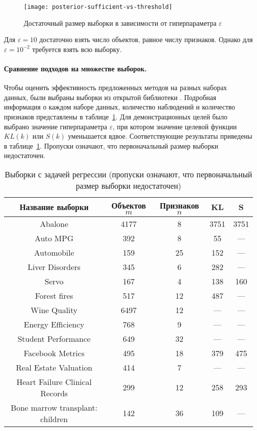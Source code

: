 \begin{figure}[h!]
    \centering
    \texttt{[image: posterior-sufficient-vs-threshold]}
    \caption{Достаточный размер выборки в зависимости от гиперпараметра $\varepsilon$}
    \label{posterior-sufficient-vs-threshold}
\end{figure}

Для $\varepsilon=10$ достаточно взять число объектов, равное числу признаков. Однако для $\varepsilon=10^{-2}$ требуется взять всю выборку.

\paragraph{Сравнение подходов на множестве выборок.}

Чтобы оценить эффективность предложенных методов на разных наборах данных, были выбраны выборки из открытой библиотеки \cite{UCI}. Подробная информация о каждом наборе данных, количество наблюдений и количество признаков представлены в таблице~\ref{table}. Для демонстрационных целей было выбрано значение гиперпараметра $\varepsilon$, при котором значение целевой функции $KL(k)$ или $S(k)$ уменьшается вдвое. Соответствующие результаты приведены в таблице~\ref{table}. Пропуски означают, что первоначальный размер выборки недостаточен.

\begin{table}
    \centering
    \caption{Выборки с задачей регрессии (пропуски означают, что первоначальный размер выборки недостаточен)}\label{table}
    \begin{tabular}{|c|c|c|c|c|}
    \hline
    Название выборки & Объектов $m$ & Признаков $n$ & KL & S \\
    \hline
    Abalone & 4177 & 8 & 3751 & 3751\\
    Auto MPG & 392 & 8 & 55 & --- \\
    Automobile & 159 & 25 & 152 & --- \\
    Liver Disorders & 345 & 6 & 282 & --- \\
    Servo & 167 & 4 & 138 & 160 \\
    Forest fires & 517 & 12 & 487 & --- \\
    Wine Quality & 6497 & 12 & --- & --- \\
    Energy Efficiency & 768 & 9 & --- & --- \\
    Student Performance & 649 & 32 & --- & --- \\
    Facebook Metrics & 495 & 18 & 379 & 475  \\
    Real Estate Valuation & 414 & 7 & --- & --- \\
    Heart Failure Clinical Records & 299 & 12 & 258 & 293 \\
    Bone marrow transplant: children & 142 & 36 & 109 & --- \\
    \hline
    \end{tabular}
\end{table}

